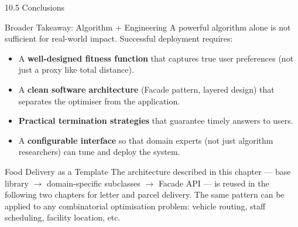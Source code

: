 \documentclass[aspectratio=169,10pt]{beamer}
\begin{document}
\begin{frame}[allowframebreaks]{10.5 Conclusions}
  \framebreak

  \begin{alertblock}{Broader Takeaway: Algorithm + Engineering}
    A powerful algorithm alone is not sufficient for real-world impact.
    Successful deployment requires:
    \begin{itemize}
      \item A \textbf{well-designed fitness function} that captures true
            user preferences (not just a proxy like total distance).
      \item A \textbf{clean software architecture} (Facade pattern, layered
            design) that separates the optimiser from the application.
      \item \textbf{Practical termination strategies} that guarantee
            timely answers to users.
      \item A \textbf{configurable interface} so that domain experts
            (not just algorithm researchers) can tune and deploy the system.
    \end{itemize}
  \end{alertblock}

  \begin{exampleblock}{Food Delivery as a Template}
    The architecture described in this chapter — base library $\to$
    domain-specific subclasses $\to$ Facade API — is reused in the
    following two chapters for letter and parcel delivery.
    The same pattern can be applied to any combinatorial optimisation
    problem: vehicle routing, staff scheduling, facility location, etc.
  \end{exampleblock}

\end{frame}
\end{document}
